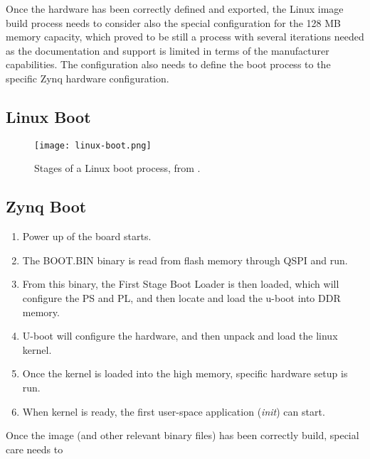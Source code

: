 Once the hardware has been correctly defined and exported, the Linux image build process needs to consider also the special configuration for the 128 MB memory capacity, which proved to be still a process with several iterations needed as the documentation and support is limited in terms of the manufacturer capabilities. The configuration also needs to define the boot process to the specific Zynq hardware configuration.

\subsection{Linux Boot}

\begin{figure}[htp]
	\centering
	\texttt{[image: linux-boot.png]}
	\caption{Stages of a Linux boot process, from \cite{Crokett2014}.} \label{fig:linux-boot}
\end{figure}

\subsection{Zynq Boot}

\begin{enumerate}
	\item Power up of the board starts.
	\item The BOOT.BIN binary is read from flash memory through QSPI and run.
	\item From this binary, the First Stage Boot Loader is then loaded, which will configure the PS and PL, and then locate and load the u-boot into DDR memory.
	\item U-boot will configure the hardware, and then unpack and load the linux kernel.
	\item Once the kernel is loaded into the high memory, specific hardware setup is run.
	\item When kernel is ready, the first user-space application (\textit{init}) can start.
\end{enumerate}

Once the image (and other relevant binary files) has been correctly build, special care needs to 
